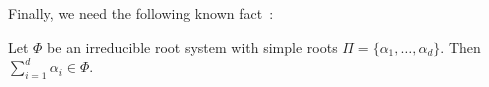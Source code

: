 \documentclass[11pt]{article}
\begin{document}
Finally, we need the following known fact~\cite{Hil16}:
\begin{fact} \label{fact:simplerootsum}
    Let $\Phi$ be an irreducible root system with simple roots $\Pi = \{\alpha_1, \dots, \alpha_d\}$.
    Then $\sum_{i=1}^d \alpha_i \in \Phi$.
\end{fact}
%
%
%
%
%
%

%
\end{document}
